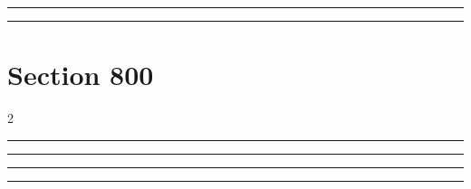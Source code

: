 \documentclass[11pt,a4paper]{article}
\begin{document}
\swarmwrapnext\lipsum[1]\lipsum[2]\lipsum[3]\lipsum[4]\lipsum[5]\lipsum[6]
\begin{swarmwrap}%
  \begin{minipage}[t]{4cm}
    \centering
    \textcolor{red!20}{\rule{\linewidth}{8cm}}
  \end{minipage}%
\end{swarmwrap}%
\swarmwrapnext\lipsum[1]
\begin{swarmwrap}%
  \begin{minipage}[t]{5cm}
    \centering
    \textcolor{red!20}{\rule{\linewidth}{9cm}}
  \end{minipage}%
\end{swarmwrap}%
\swarmwrapnext\lipsum[1]\lipsum[2]
\section{Section 800}
\begin{multicols}{2}
\begin{swarmwrap}%
  \begin{minipage}[t]{2cm}
    \centering
    \textcolor{blue!30}{\rule{\linewidth}{10cm}}
  \end{minipage}%
\end{swarmwrap}%
\swarmwrapnext\lipsum[1]\lipsum[2]
\end{multicols}
\begin{swarmwrap}%
  \begin{minipage}[t]{3cm}
    \centering
    \textcolor{red!20}{\rule{\linewidth}{2cm}}
  \end{minipage}%
\end{swarmwrap}%
\swarmwrapnext\lipsum[1]\lipsum[2]\lipsum[3]\lipsum[4]
\begin{swarmwrap}%
  \begin{minipage}[t]{4cm}
    \centering
    \textcolor{red!20}{\rule{\linewidth}{3cm}}
  \end{minipage}%
\end{swarmwrap}%
\swarmwrapnext\lipsum[1]\lipsum[2]\lipsum[3]\lipsum[4]\lipsum[5]
\begin{swarmwrap}%
  \begin{minipage}[t]{5cm}
    \centering
    \textcolor{red!20}{\rule{\linewidth}{4cm}}
  \end{minipage}%
\end{swarmwrap}%
\end{document}

